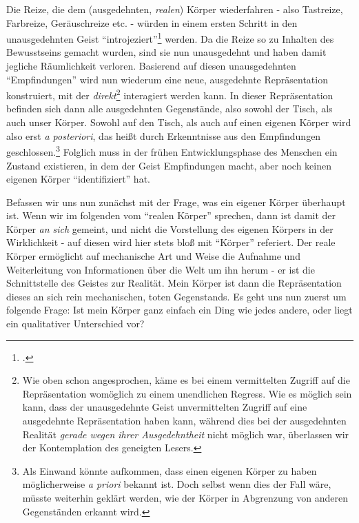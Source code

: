 \documentclass[a4paper, 12pt]{article}
\begin{document}
\begin{onehalfspace}
Die Reize, die dem (ausgedehnten, \emph{realen}) Körper wiederfahren - also Tastreize, Farbreize, Geräuschreize etc. - würden in einem ersten Schritt in den unausgedehnten Geist "`introjeziert"'\footnote{\Cite[Vgl.][S. ???]{scheler-ethik}.} werden. Da die Reize so zu Inhalten des Bewusstseins gemacht wurden, sind sie nun unausgedehnt und haben damit jegliche Räumlichkeit verloren. Basierend auf diesen unausgedehnten "`Empfindungen"' wird nun wiederum eine neue, ausgedehnte Repräsentation konstruiert, mit der \emph{direkt}\footnote{Wie oben schon angesprochen, käme es bei einem vermittelten Zugriff auf die Repräsentation womöglich zu einem unendlichen Regress. Wie es möglich sein kann, dass der unausgedehnte Geist unvermittelten Zugriff auf eine ausgedehnte Repräsentation haben kann, während dies bei der ausgedehnten Realität \emph{gerade wegen ihrer Ausgedehntheit} nicht möglich war, überlassen wir der Kontemplation des geneigten Lesers.} interagiert werden kann. In dieser Repräsentation befinden sich dann alle ausgedehnten Gegenstände, also sowohl der Tisch, als auch unser Körper. Sowohl auf den Tisch, als auch auf einen eigenen Körper wird also erst \emph{a posteriori}, das heißt durch Erkenntnisse aus den Empfindungen geschlossen.\footnote{Als Einwand könnte aufkommen, dass einen eigenen Körper zu haben möglicherweise \emph{a priori} bekannt ist. Doch selbst wenn dies der Fall wäre, müsste weiterhin geklärt werden, wie der Körper in Abgrenzung von anderen Gegenständen erkannt wird.} Folglich muss in der frühen Entwicklungsphase des Menschen ein Zustand existieren, in dem der Geist Empfindungen macht, aber noch keinen eigenen Körper "`identifiziert"' hat.  

Befassen wir uns nun zunächst mit der Frage, was ein eigener Körper überhaupt ist. Wenn wir im folgenden vom "`realen Körper"' sprechen, dann ist damit der Körper \emph{an sich} gemeint, und nicht die Vorstellung des eigenen Körpers in der Wirklichkeit - auf diesen wird hier stets bloß mit "`Körper"' referiert. Der reale Körper ermöglicht auf mechanische Art und Weise die Aufnahme und Weiterleitung von Informationen über die Welt um ihn herum - er ist die Schnittstelle des Geistes zur Realität. Mein Körper ist dann die Repräsentation dieses an sich rein mechanischen, toten Gegenstands. Es geht uns nun zuerst um folgende Frage: Ist mein Körper ganz einfach ein Ding wie jedes andere, oder liegt ein qualitativer Unterschied vor? 


\end{onehalfspace}
\end{document}
